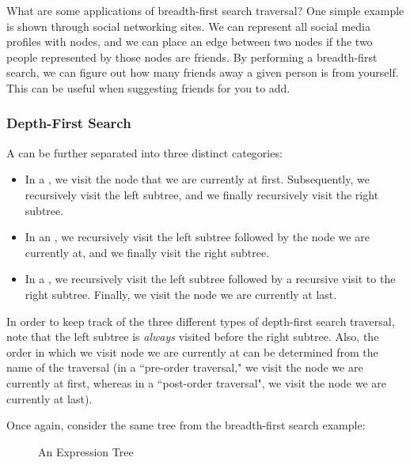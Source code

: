 What are some applications of breadth-first search traversal? One simple example is shown through social networking sites. We can represent all social media profiles with nodes, and we can place an edge between two nodes if the two people represented by those nodes are friends. By performing a breadth-first search, we can figure out how many friends away a given person is from yourself. This can be useful when suggesting friends for you to add. 

\subsubsection{Depth-First Search}

A  can be further separated into three distinct categories:

\begin{itemize}
    \item In a , we visit the node that we are currently at first. Subsequently, we recursively visit the left subtree, and we finally recursively visit the right subtree.
    \item In an , we recursively visit the left subtree followed by the node we are currently at, and we finally visit the right subtree.
    \item In a , we recursively visit the left subtree followed by a recursive visit to the right subtree. Finally, we visit the node we are currently at last.
\end{itemize}

\noindent In order to keep track of the three different types of depth-first search traversal, note that the left subtree is \textit{always} visited before the right subtree. Also, the order in which we visit node we are currently at can be determined from the name of the traversal (in a ``pre-order traversal," we visit the node we are currently at first, whereas in a ``post-order traversal", we visit the node we are currently at last).

Once again, consider the same tree from the breadth-first search example:

\begin{figure}[h]
\centering
{}
\caption{An Expression Tree}
\end{figure}

